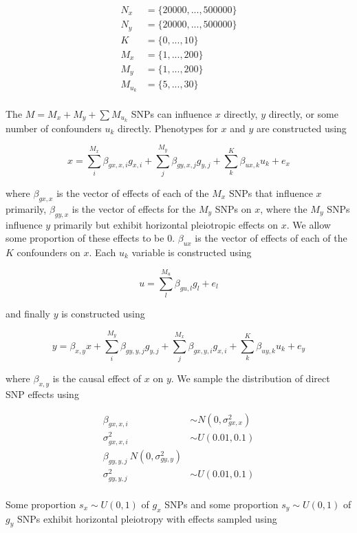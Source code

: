 \documentclass[]{article}
\begin{document}
\[
\begin{aligned}
N_x & = \{20000, ..., 500000\} \\
N_y & = \{20000, ..., 500000\} \\
K & = \{0, ..., 10\} \\
M_x & = \{1, ..., 200\} \\
M_y & = \{1, ..., 200\} \\
M_{u_k} & = \{5,..., 30\} \\
\end{aligned}
\]

The \(M = M_x + M_y + \sum{M_{u_k}}\) SNPs can influence \(x\) directly,
\(y\) directly, or some number of confounders \(u_{k}\) directly.
Phenotypes for \(x\) and \(y\) are constructed using

\[
x = \sum^{M_x}_{i}{\beta_{gx,x,i}g_{x,i}} + \sum^{M_y}_{j}{\beta_{gy,x,j}g_{y,j}} + \sum^{K}_{k}{\beta_{ux,k} u_{k}} + e_{x}
\]

where \(\beta_{gx,x}\) is the vector of effects of each of the \(M_x\)
SNPs that influence \(x\) primarily, \(\beta_{gy,x}\) is the vector of
effects for the \(M_y\) SNPs on \(x\), where the \(M_y\) SNPs influence
\(y\) primarily but exhibit horizontal pleiotropic effects on \(x\). We
allow some proportion of these effects to be 0. \(\beta_{ux}\) is the
vector of effects of each of the \(K\) confounders on \(x\). Each
\(u_{k}\) variable is constructed using

\[
u = \sum^{M_u}_{l}{\beta_{gu,l}g_{l}} + e_{l}
\]

and finally \(y\) is constructed using

\[
y = \beta_{x,y}x + \sum^{M_y}_{i}{\beta_{gy,y,j}g_{y,j}} + \sum^{M_x}_{j}{\beta_{gx,y,i}g_{x,i}} + \sum^{K}_{k}{\beta_{uy,k} u_{k}} + e_{y}
\]

where \(\beta_{x,y}\) is the causal effect of \(x\) on \(y\). We sample
the distribution of direct SNP effects using

\[
\begin{aligned}
\beta_{gx,x,i} & \sim N(0, \sigma^2_{gx,x}) \\
\sigma^2_{gx,x,i} & \sim U(0.01, 0.1) \\
\beta_{gy,y,j} ~ N(0, \sigma^2_{gy,y}) \\
\sigma^2_{gy,y,j} & \sim U(0.01, 0.1) \\
\end{aligned}
\]

Some proportion \(s_x \sim U(0,1)\) of \(g_x\) SNPs and some proportion
\(s_y \sim U(0,1)\) of \(g_y\) SNPs exhibit horizontal pleiotropy with
effects sampled using
\end{document}
